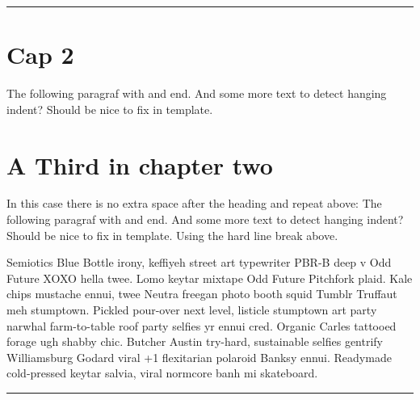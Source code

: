 \pend
\begin{center}
\rule{3in}{0.4pt}
\end{center}

\endnumbering

\newpage\beginnumbering
\section*{Cap 2}

\pstart
The following paragraf with  and end. And some more text to detect hanging indent? Should be nice to fix in template. 

\pend
\section*{A Third  in chapter two}

\pstart
In this case there is no extra space after the heading and repeat above: The following paragraf with  and end. And some more text to detect hanging indent? Should be nice to fix in template.\newline
Using the hard line break above. 

\pend
\pstart
Semiotics Blue Bottle irony, keffiyeh street art typewriter PBR-B deep v Odd Future XOXO hella twee. Lomo keytar mixtape Odd Future Pitchfork plaid. Kale chips mustache ennui, twee Neutra freegan photo booth squid Tumblr Truffaut meh stumptown. Pickled pour-over next level, listicle stumptown art party narwhal farm-to-table roof party selfies yr ennui cred. Organic Carles tattooed forage ugh shabby chic. Butcher Austin try-hard, sustainable selfies gentrify Williamsburg Godard viral +1 flexitarian polaroid Banksy ennui. Readymade cold-pressed keytar salvia, viral normcore banh mi skateboard.

\pend
\begin{center}
\rule{3in}{0.4pt}
\end{center}

\endnumbering
